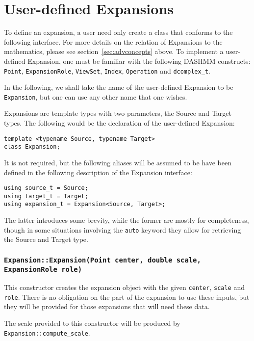 \section{User-defined Expansions}

To define an expansion, a user need only create a class that conforms to the
following interface. For more details on the relation of Expansions to the
mathematics, please see section~\ref{sec:advconcepts} above. To implement a
user-defined Expansion, one must be familiar with the following DASHMM
constructs: \texttt{Point}, \texttt{ExpansionRole}, \texttt{ViewSet},
\texttt{Index}, \texttt{Operation} and \texttt{dcomplex\_t}.

In the following, we shall take the name of the user-defined Expansion to
be \texttt{Expansion}, but one can use any other name that one wishes.

Expansions are template types with two parameters, the Source and Target
types. The following would be the declaration of the user-defined Expansion:

\begin{verbatim}
template <typename Source, typename Target>
class Expansion;
\end{verbatim}

\noindent It is not required, but the following aliases will be assumed to be
have been defined in the following description of the Expansion interface:

\begin{verbatim}
using source_t = Source;
using target_t = Target;
using expansion_t = Expansion<Source, Target>;
\end{verbatim}

\noindent The latter introduces some brevity, while the former are mostly
for completeness, though in some situations involving the \texttt{auto} keyword
they allow for retrieving the Source and Target type.

\subsubsection{\texttt{Expansion::Expansion(Point center, double scale, ExpansionRole role)}}

This constructor creates the expansion object with the given \texttt{center},
\texttt{scale} and \texttt{role}. There is no obligation on the part of the
expansion to use these inputs, but they will be provided for those expansions
that will need these data.

The scale provided to this constructor will be produced by
\texttt{Expansion::compute\_scale}.

